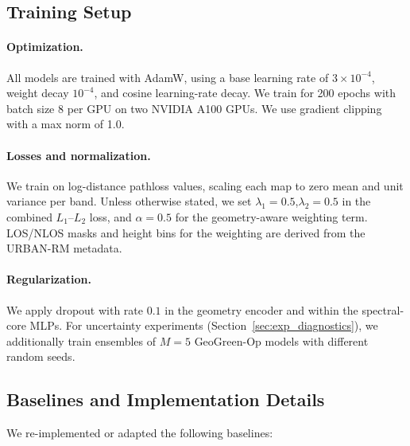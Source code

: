 \documentclass{article}
\begin{document}
\subsection{Training Setup}

\paragraph{Optimization.}
All models are trained with AdamW, using a base learning rate
of $3 \times 10^{-4}$, weight decay $10^{-4}$,
and cosine learning-rate decay.
We train for 200 epochs with batch size 8 per GPU on two
NVIDIA A100 GPUs.
We use gradient clipping with a max norm of 1.0.

\paragraph{Losses and normalization.}
We train on log-distance pathloss values,
scaling each map to zero mean and unit variance per band.
Unless otherwise stated, we set $\lambda_1 = 0.5$,$\lambda_2 = 0.5$
in the combined $L_1$–$L_2$ loss,
and $\alpha = 0.5$ for the geometry-aware weighting term.
LOS/NLOS masks and height bins for the weighting are derived
from the URBAN-RM metadata.

\paragraph{Regularization.}
We apply dropout with rate $0.1$ in the geometry encoder and
within the spectral-core MLPs.
For uncertainty experiments (Section~\ref{sec:exp_diagnostics}),
we additionally train ensembles of $M=5$ GeoGreen-Op models
with different random seeds.

\subsection{Baselines and Implementation Details}

We re-implemented or adapted the following baselines:
\end{document}

